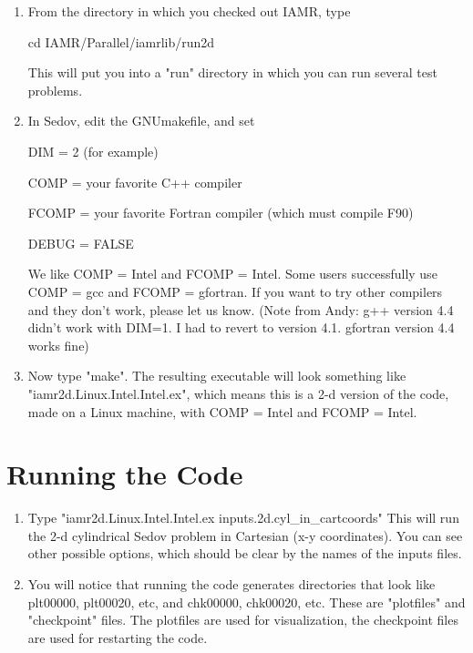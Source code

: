 \begin{enumerate}

\item From the directory in which you checked out IAMR, type

cd IAMR/Parallel/iamrlib/run2d

This will put you into a "run" directory in which you can run several test problems.
\item In Sedov, edit the GNUmakefile, and set

DIM = 2 (for example)

COMP = your favorite C++ compiler

FCOMP = your favorite Fortran compiler (which must compile F90)

DEBUG = FALSE

We like COMP = Intel and FCOMP = Intel. Some users successfully use 
COMP = gcc and FCOMP = gfortran. If you want to try other compilers and they don't work, 
please let us know.  
(Note from Andy: g++ version 4.4 didn't work with DIM=1.  
I had to revert to version 4.1.  gfortran version 4.4 works fine)

\item Now type "make". The resulting executable will look something like 
"iamr2d.Linux.Intel.Intel.ex", which means this is a 2-d version of the code, 
made on a Linux machine, with COMP = Intel and FCOMP = Intel.

\end{enumerate}

\section{Running the Code}

\begin{enumerate}

\item Type "iamr2d.Linux.Intel.Intel.ex inputs.2d.cyl\_in\_cartcoords" 
This will run the 2-d cylindrical Sedov problem in Cartesian (x-y coordinates). 
You can see other possible options, which should be clear by the names of the inputs files.

\item You will notice that running the code generates directories that look like 
plt00000, plt00020, etc, and chk00000, chk00020, etc. These are "plotfiles" and 
"checkpoint" files. The plotfiles are used for visualization, the checkpoint files are 
used for restarting the code.

\end{enumerate}

